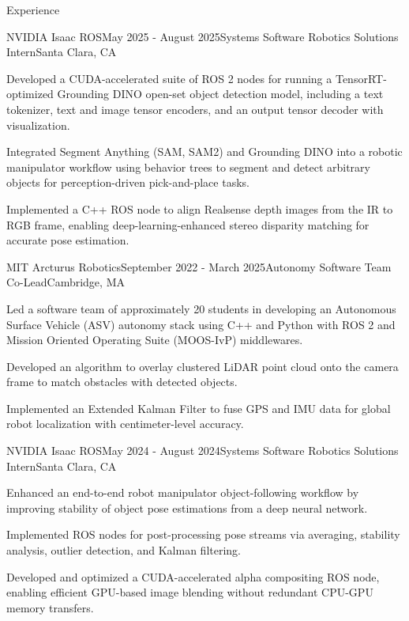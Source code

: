 \documentclass[
	11pt,
]{resume}
\begin{document}
\begin{rSection}{Experience}
\begin{rSubsection}{NVIDIA Isaac ROS}{May 2025 - August 2025}{Systems Software Robotics Solutions Intern}{Santa Clara, CA}
    \item Developed a CUDA-accelerated suite of ROS 2 nodes for running a TensorRT-optimized Grounding DINO open-set object detection model, including a text tokenizer, text and image tensor encoders, and an output tensor decoder with visualization.
    \item Integrated Segment Anything (SAM, SAM2) and Grounding DINO into a robotic manipulator workflow using behavior trees to segment and detect arbitrary objects for perception-driven pick-and-place tasks.
    \item Implemented a C++ ROS node to align Realsense depth images from the IR to RGB frame, enabling deep-learning-enhanced stereo disparity matching for accurate pose estimation.
\end{rSubsection}

\begin{rSubsection}{MIT Arcturus Robotics}{September 2022 - March 2025}{Autonomy Software Team Co-Lead}{Cambridge, MA}
    \item Led a software team of approximately 20 students in developing an Autonomous Surface Vehicle (ASV) autonomy stack using C++ and Python with ROS 2 and Mission Oriented Operating Suite (MOOS-IvP) middlewares.
    \item Developed an algorithm to overlay clustered LiDAR point cloud onto the camera frame to match obstacles with detected objects.
    \item Implemented an Extended Kalman Filter to fuse GPS and IMU data for global robot localization with centimeter-level accuracy.
\end{rSubsection}

\begin{rSubsection}{NVIDIA Isaac ROS}{May 2024 - August 2024}{Systems Software Robotics Solutions Intern}{Santa Clara, CA}
    \item Enhanced an end-to-end robot manipulator object-following workflow by improving stability of object pose estimations from a deep neural network.
    \item Implemented ROS nodes for post-processing pose streams via averaging, stability analysis, outlier detection, and Kalman filtering.
    \item Developed and optimized a CUDA-accelerated alpha compositing ROS node, enabling efficient GPU-based image blending without redundant CPU-GPU memory transfers.
\end{rSubsection}


\end{rSection}
\end{document}
